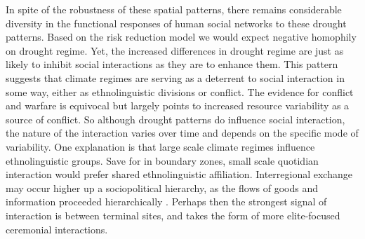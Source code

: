 \documentclass[10pt]{iopart}
\begin{document}
In spite of the robustness of these spatial patterns, there remains considerable diversity in the functional responses of human social networks to these drought patterns. Based on the risk reduction model we would expect negative homophily on drought regime. Yet, the increased differences in drought regime are just as likely to inhibit social interactions as they are to enhance them. This pattern suggests that climate regimes are serving as a deterrent to social interaction in some way, either as ethnolinguistic divisions or conflict. The evidence for conflict and warfare is equivocal \parencite{Kohler2014, leblanc} but largely points to increased resource variability as a source of conflict. So although drought patterns do influence social interaction, the nature of the interaction varies over time and depends on the specific mode of variability. One explanation is that large scale climate regimes influence ethnolinguistic groups. Save for in boundary zones, small scale quotidian interaction would prefer shared ethnolinguistic affiliation. Interregional exchange may occur higher up a sociopolitical hierarchy, as the flows of goods and information proceeded hierarchically \parencite{Crumley1979}. Perhaps then the strongest signal of interaction is between terminal sites, and takes the form of more elite-focused ceremonial interactions.
\end{document}
